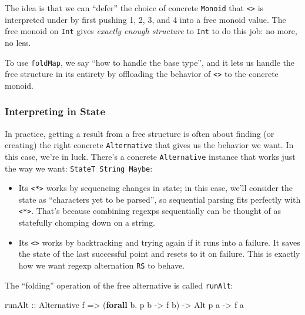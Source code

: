 \documentclass[]{article}
\newenvironment{Shaded}{}{}
\newcommand{\DataTypeTok}[1]{\textcolor[rgb]{0.56,0.13,0.00}{#1}}
\newcommand{\KeywordTok}[1]{\textcolor[rgb]{0.00,0.44,0.13}{\textbf{#1}}}
\newcommand{\NormalTok}[1]{#1}
\newcommand{\OperatorTok}[1]{\textcolor[rgb]{0.40,0.40,0.40}{#1}}
\newcommand{\OtherTok}[1]{\textcolor[rgb]{0.00,0.44,0.13}{#1}}
\begin{document}
The idea is that we can ``defer'' the choice of concrete \texttt{Monoid} that
\texttt{\textless{}\textgreater{}} is interpreted under by first pushing 1, 2,
3, and 4 into a free monoid value. The free monoid on \texttt{Int} gives
\emph{exactly enough structure} to \texttt{Int} to do this job: no more, no
less.

To use \texttt{foldMap}, we say ``how to handle the base type'', and it lets us
handle the free structure in its entirety by offloading the behavior of
\texttt{\textless{}\textgreater{}} to the concrete monoid.

\subsubsection{Interpreting in State}\label{interpreting-in-state}

In practice, getting a result from a free structure is often about finding (or
creating) the right concrete \texttt{Alternative} that gives us the behavior we
want. In this case, we're in luck. There's a concrete \texttt{Alternative}
instance that works just the way we want: \texttt{StateT\ String\ Maybe}:

\begin{itemize}
\tightlist
\item
  Its \texttt{\textless{}*\textgreater{}} works by sequencing changes in state;
  in this case, we'll consider the state as ``characters yet to be parsed'', so
  sequential parsing fits perfectly with \texttt{\textless{}*\textgreater{}}.
  That's because combining regexps sequentially can be thought of as statefully
  chomping down on a string.
\item
  Its \texttt{\textless{}\textbar{}\textgreater{}} works by backtracking and
  trying again if it runs into a failure. It saves the state of the last
  successful point and resets to it on failure. This is exactly how we want
  regexp alternation \texttt{R\textbar{}S} to behave.
\end{itemize}

The ``folding'' operation of the free alternative is called \texttt{runAlt}:

\begin{Shaded}
\begin{Highlighting}[]
\OtherTok{runAlt ::} \DataTypeTok{Alternative}\NormalTok{ f}
       \OtherTok{=\textgreater{}}\NormalTok{ (}\KeywordTok{forall}\NormalTok{ b}\OperatorTok{.}\NormalTok{ p b }\OtherTok{{-}\textgreater{}}\NormalTok{ f b)}
       \OtherTok{{-}\textgreater{}} \DataTypeTok{Alt}\NormalTok{ p a}
       \OtherTok{{-}\textgreater{}}\NormalTok{ f a}
\end{Highlighting}
\end{Shaded}
\end{document}

